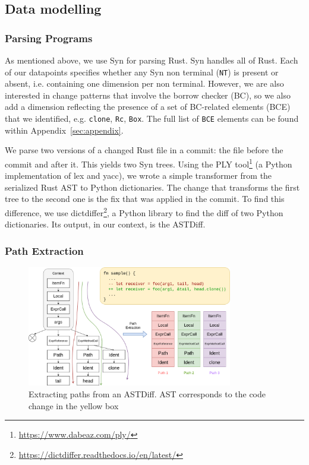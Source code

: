 \subsection{\label{sec:data_modelling}Data modelling}

\subsubsection{\label{sec:parsing_programs}Parsing Programs}

As mentioned above, we use Syn for parsing Rust. Syn handles all of Rust. Each of our datapoints specifies whether any Syn non terminal (\texttt{NT}) is present or absent, i.e. containing one dimension per non terminal. However, we are also interested in change patterns that involve the borrow checker (BC), so we also add a dimension reflecting the presence of a set of BC-related elements (BCE) that we identified, e.g. \texttt{clone}, \texttt{Rc}, \texttt{Box}. The full list of \verb+BCE+ elements can be found within Appendix~\ref{sec:appendix}.

We parse two versions of a changed Rust file in a commit: the file before the commit and after it. This yields two Syn trees. Using the PLY tool\footnote{\url{https://www.dabeaz.com/ply/}} (a Python implementation of lex and yacc), we wrote a simple transformer from the serialized Rust AST to Python dictionaries. The change that transforms the first tree to the second one is the fix that was applied in the commit. To find this difference, we use dictdiffer\footnote{\url{https://dictdiffer.readthedocs.io/en/latest/}}, a Python library to find the diff of two Python dictionaries. Its output, in our context, is the ASTDiff.

\subsubsection{\label{sec:path_extraction}Path Extraction}

\begin{figure}[h]
\centering
\includegraphics[width=0.8\textwidth]{figs/extraction.png}
\caption{\label{fig:extraction}Extracting paths from an ASTDiff. AST corresponds to the code change in the yellow box}
\end{figure}



